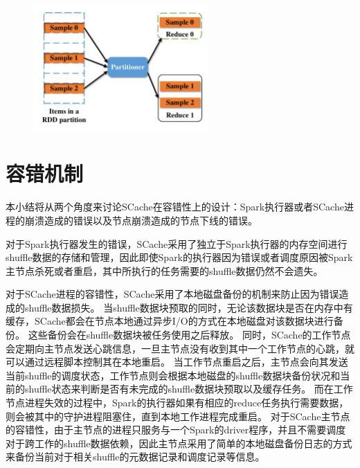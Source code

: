 \begin{figure}[!htp]
	\centering
	\includegraphics[width=0.6\textwidth]{../../PPoPP-2018/fig/sample.pdf}
\end{figure}

\section{容错机制}

本小结将从两个角度来讨论SCache在容错性上的设计：Spark执行器或者SCache进程的崩溃造成的错误以及节点崩溃造成的节点下线的错误。

对于Spark执行器发生的错误，SCache采用了独立于Spark执行器的内存空间进行shuffle数据的存储和管理，因此即使Spark的执行器因为错误或者调度原因被Spark主节点杀死或者重启，其中所执行的任务需要的shuffle数据仍然不会遗失。

对于SCache进程的容错性，SCache采用了本地磁盘备份的机制来防止因为错误造成的shuffle数据损失。
当shuffle数据块预取的同时，无论该数据块是否在内存中有缓存，SCache都会在节点本地通过异步I/O的方式在本地磁盘对该数据块进行备份。
这些备份会在shuffle数据块被任务使用之后释放。
同时，SCache的工作节点会定期向主节点发送心跳信息，一旦主节点没有收到其中一个工作节点的心跳，就可以通过远程脚本控制其在本地重启。
当工作节点重启之后，主节点会向其发送当前shuffle的调度状态，工作节点则会根据本地磁盘的shuffle数据块备份状况和当前的shuffle状态来判断是否有未完成的shuffle数据块预取以及缓存任务。
而在工作节点进程失效的过程中，Spark的执行器如果有相应的reduce任务执行需要数据，则会被其中的守护进程阻塞住，直到本地工作进程完成重启。
对于SCache主节点的容错性，由于主节点的进程只服务与一个Spark的driver程序，并且不需要调度对于跨工作的shuffle数据依赖，因此主节点采用了简单的本地磁盘备份日志的方式来备份当前对于相关shuffle的元数据记录和调度记录等信息。

